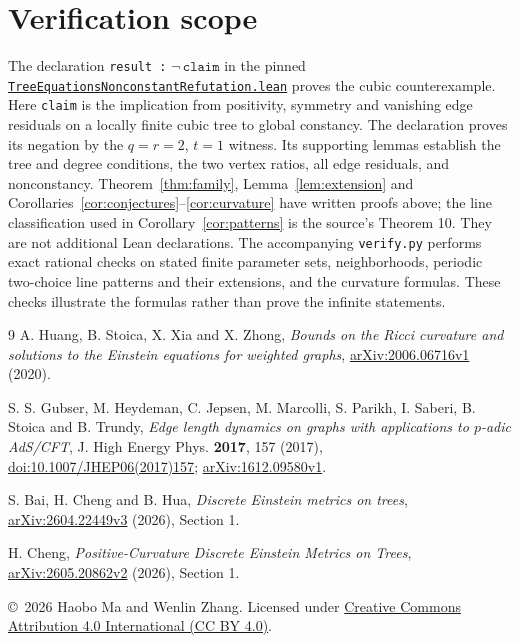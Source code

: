 \documentclass[11pt]{article}
\begin{document}
\section{Verification scope}
The declaration \texttt{result :} $\neg\,\texttt{claim}$ in the pinned
\href{https://github.com/the-omega-institute/trureturing/blob/50f2a97bb5e704842f2c32c6095f68a0dc62c779/D5/S3/Geometry/DiscreteGravity/TreeEquationsNonconstantRefutation.lean}{\texttt{TreeEquationsNonconstantRefutation.lean}}
proves the cubic counterexample.
Here \texttt{claim} is the implication from positivity, symmetry and
vanishing edge residuals on a locally finite cubic tree to global
constancy. The declaration proves its negation by the $q=r=2$, $t=1$
witness. Its supporting lemmas establish the tree and degree conditions,
the two vertex ratios, all edge residuals, and nonconstancy.
Theorem~\ref{thm:family}, Lemma~\ref{lem:extension} and
Corollaries~\ref{cor:conjectures}--\ref{cor:curvature} have written
proofs above; the line classification used in Corollary~\ref{cor:patterns}
is the source's Theorem 10. They are not additional Lean declarations.
The accompanying \texttt{verify.py} performs exact rational checks on
stated finite parameter sets, neighborhoods, periodic two-choice line
patterns and their extensions, and the curvature formulas. These checks
illustrate the formulas rather than prove the infinite statements.

\begin{thebibliography}{9}
A. Huang, B. Stoica, X. Xia and X. Zhong,
\emph{Bounds on the Ricci curvature and solutions to the Einstein
equations for weighted graphs},
\href{https://arxiv.org/abs/2006.06716v1}{arXiv:2006.06716v1} (2020).

S. S. Gubser, M. Heydeman, C. Jepsen, M. Marcolli, S. Parikh,
I. Saberi, B. Stoica and B. Trundy,
\emph{Edge length dynamics on graphs with applications to $p$-adic AdS/CFT},
J. High Energy Phys. \textbf{2017}, 157 (2017),
\href{https://doi.org/10.1007/JHEP06(2017)157}{doi:10.1007/JHEP06(2017)157};
\href{https://arxiv.org/abs/1612.09580v1}{arXiv:1612.09580v1}.

S. Bai, H. Cheng and B. Hua,
\emph{Discrete Einstein metrics on trees},
\href{https://arxiv.org/abs/2604.22449v3}{arXiv:2604.22449v3} (2026), Section 1.

H. Cheng,
\emph{Positive-Curvature Discrete Einstein Metrics on Trees},
\href{https://arxiv.org/abs/2605.20862v2}{arXiv:2605.20862v2} (2026), Section 1.
\end{thebibliography}

\noindent\small\copyright\ 2026 Haobo Ma and Wenlin Zhang.
Licensed under \href{https://creativecommons.org/licenses/by/4.0/}{Creative Commons Attribution 4.0 International (CC BY 4.0)}.
\end{document}

